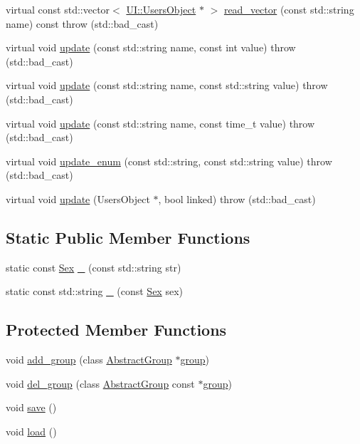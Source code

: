 \begin{DoxyCompactItemize}
\item 
virtual const std::vector$<$ \hyperlink{classUI_1_1UsersObject}{UI::UsersObject} $\ast$ $>$ \hyperlink{classCore_1_1Person_ab28c3e468d265c16bce1d4488493c5a6}{read\_\-vector} (const std::string name) const   throw (std::bad\_\-cast)
\item 
virtual void \hyperlink{classCore_1_1Person_ac2900dc24258c00ea1de17350c3f4658}{update} (const std::string name, const int value)  throw (std::bad\_\-cast)
\item 
virtual void \hyperlink{classCore_1_1Person_a51ec02307587cf9dfd7ed3036cf202cd}{update} (const std::string name, const std::string value)  throw (std::bad\_\-cast)
\item 
virtual void \hyperlink{classCore_1_1Person_ad650eba89f671041c26f8d1419f6e6c8}{update} (const std::string name, const time\_\-t value)  throw (std::bad\_\-cast)
\item 
virtual void \hyperlink{classCore_1_1Person_a1c6826659c2413189dae536f7c83af98}{update\_\-enum} (const std::string, const std::string value)  throw (std::bad\_\-cast)
\item 
virtual void \hyperlink{classCore_1_1Person_a50fa1e127f56e2caa873017b54c090cb}{update} (UsersObject $\ast$, bool linked)  throw (std::bad\_\-cast)
\end{DoxyCompactItemize}
\subsection*{Static Public Member Functions}
\begin{DoxyCompactItemize}
\item 
static const \hyperlink{classCore_1_1Person_a01e6eee93727f9ce06525eca689b4764}{Sex} \hyperlink{classCore_1_1Person_a88e1d40e7be7d95e6cec9bc623d6e076}{\_\-} (const std::string str)
\item 
static const std::string \hyperlink{classCore_1_1Person_a7ded3b871b2e7f6ce35b7b1f4e1738ee}{\_\-} (const \hyperlink{classCore_1_1Person_a01e6eee93727f9ce06525eca689b4764}{Sex} sex)
\end{DoxyCompactItemize}
\subsection*{Protected Member Functions}
\begin{DoxyCompactItemize}
\item 
void \hyperlink{classCore_1_1Person_aa9b9581966365e7272d43e77f7a220e4}{add\_\-group} (class \hyperlink{classCore_1_1AbstractGroup}{AbstractGroup} $\ast$\hyperlink{group__content_8h_a27517aa1480ab2d9bfe5d62e693b33eb}{group})
\item 
void \hyperlink{classCore_1_1Person_a0057f7bd335dd35e470e67ad2e22b0d5}{del\_\-group} (class \hyperlink{classCore_1_1AbstractGroup}{AbstractGroup} const $\ast$\hyperlink{group__content_8h_a27517aa1480ab2d9bfe5d62e693b33eb}{group})
\item 
void \hyperlink{classCore_1_1Person_a846fa55a79f6da0258d711adc88a1a30}{save} ()
\item 
void \hyperlink{classCore_1_1Person_ae88c1b9c89b03ac7f4ba3ddcff4c62a7}{load} ()
\end{DoxyCompactItemize}
